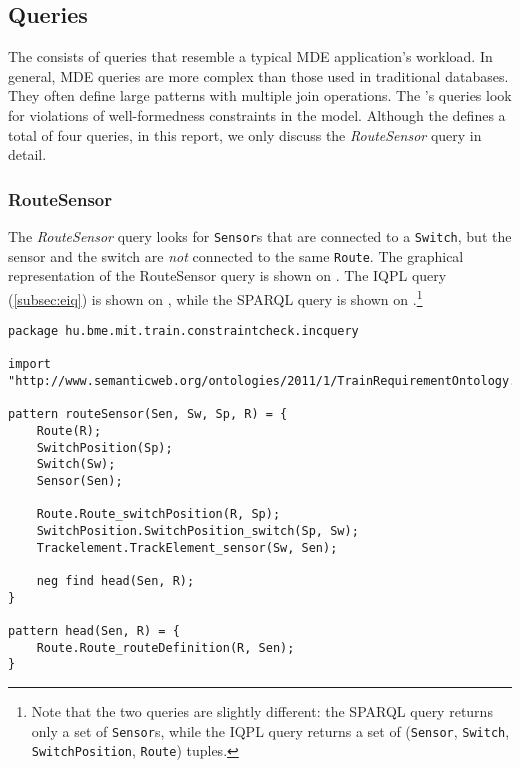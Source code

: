 \subsection{Queries}

The \tb{} consists of queries that resemble a typical MDE application's workload. In general, MDE queries are more complex than those used in traditional databases. They often define large patterns with multiple join operations. The \tb{}'s queries look for violations of well-formedness constraints in the model. Although the \tb{} defines a total of four queries, in this report, we only discuss the \textit{RouteSensor} query in detail.

\subsubsection{RouteSensor}


The \textit{RouteSensor} query looks for \texttt{Sensor}s that are connected to a \texttt{Switch}, but the sensor and the switch are \emph{not} connected to the same \texttt{Route}. The graphical representation of the RouteSensor query is shown on . The IQPL query (\autoref{subsec:eiq}) is shown on , while the SPARQL query is shown on .\footnote{Note that the two queries are slightly different: the SPARQL query returns only a set of \texttt{Sensor}s, while the IQPL query returns a set of (\texttt{Sensor}, \texttt{Switch}, \texttt{SwitchPosition}, \texttt{Route}) tuples.} %

\lstset{language=viatra}

\begin{lstlisting}[caption=The \emph{RouteSensor} query in IQPL, label=lst:routesensor-iqpl]
package hu.bme.mit.train.constraintcheck.incquery

import "http://www.semanticweb.org/ontologies/2011/1/TrainRequirementOntology.owl" 

pattern routeSensor(Sen, Sw, Sp, R) = {
	Route(R);
	SwitchPosition(Sp);
	Switch(Sw);
	Sensor(Sen);
	
	Route.Route_switchPosition(R, Sp);
	SwitchPosition.SwitchPosition_switch(Sp, Sw);
	Trackelement.TrackElement_sensor(Sw, Sen);
	
	neg find head(Sen, R);	
}

pattern head(Sen, R) = {
	Route.Route_routeDefinition(R, Sen);
}
\end{lstlisting}


